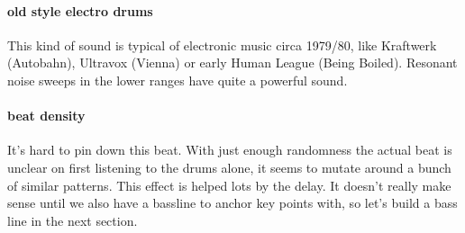 \paragraph{old style electro drums}
This kind of sound is typical of electronic
music circa 1979/80, like Kraftwerk (Autobahn), Ultravox (Vienna) or early
Human League (Being Boiled). Resonant noise sweeps in the lower ranges
have quite a powerful sound. 

\paragraph{beat density} 
It's hard to pin down this beat.
With just enough randomness the actual beat is unclear on first
listening to the drums alone, it seems to mutate around a bunch
of similar patterns. This effect is helped lots by the delay. It
doesn't really make sense until we also have a bassline to
anchor key points with, so let's build a bass line in the
next section.
